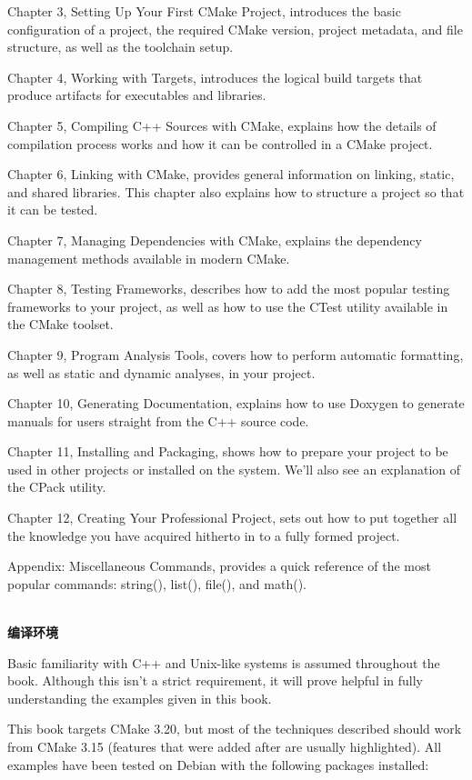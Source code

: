 Chapter 3, Setting Up Your First CMake Project, introduces the basic configuration of a project, the required CMake version, project metadata, and file structure, as well as the toolchain setup.

Chapter 4, Working with Targets, introduces the logical build targets that produce artifacts for executables and libraries.

Chapter 5, Compiling C++ Sources with CMake, explains how the details of compilation process works and how it can be controlled in a CMake project.

Chapter 6, Linking with CMake, provides general information on linking, static, and shared libraries. This chapter also explains how to structure a project so that it can be tested.

Chapter 7, Managing Dependencies with CMake, explains the dependency management methods available in modern CMake.

Chapter 8, Testing Frameworks, describes how to add the most popular testing frameworks to your project, as well as how to use the CTest utility available in the CMake toolset.

Chapter 9, Program Analysis Tools, covers how to perform automatic formatting, as well as static and dynamic analyses, in your project.

Chapter 10, Generating Documentation, explains how to use Doxygen to generate manuals for users straight from the C++ source code.

Chapter 11, Installing and Packaging, shows how to prepare your project to be used in other projects or installed on the system. We'll also see an explanation of the CPack utility.

Chapter 12, Creating Your Professional Project, sets out how to put together all the knowledge you have acquired hitherto in to a fully formed project.

Appendix: Miscellaneous Commands, provides a quick reference of the most popular commands: string(), list(), file(), and math().

\hspace*{\fill} \\ %
\textbf{编译环境}

Basic familiarity with C++ and Unix-like systems is assumed throughout the book. Although this isn't a strict requirement, it will prove helpful in fully understanding the examples given in this book.

This book targets CMake 3.20, but most of the techniques described should work from CMake 3.15 (features that were added after are usually highlighted). All examples have been tested on Debian with the following packages installed:

